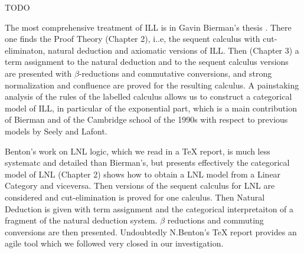 TODO

The most comprehensive treatment of ILL is in Gavin Bierman's thesis
\cite{Bierman:1994}.  There one finds the Proof Theory (Chapter 2),
i..e, the sequent calculus with cut-eliminaton, natural deduction and
axiomatic versions of ILL. Then (Chapter 3) a term assignment to the
natural deduction and to the sequent calculus versions are presented
with $\beta$-reductions and commutative conversions, and strong
normalization and confluence are proved for the resulting calculus. A
painstaking analysis of the rules of the labelled calculus allows us
to construct a categorical model of ILL, in particular of the
exponential part, which is a main contribution of Bierman and of the
Cambridge school of the 1990s with respect to previous models by Seely
and Lafont.

Benton's work \cite{Benton:1994} on LNL logic, which we read in a TeX
report, is much less systematc and detailed than Bierman's, but
presents effectively the categorical model of LNL (Chapter 2) shows
how to obtain a LNL model from a Linear Category and viceversa. Then
versions of the sequent calculus for LNL are considered and
cut-elimination is proved for one calculus. Then Natural Deduction is
given with term assignment and the categorical interpretaiton of a
fragment of the natural deduction system. $\beta$ reductions and
commuting conversions are then presented.  Undoubtedly N.Benton's TeX
report provides an agile tool which we followed very closed in our
investigation.
